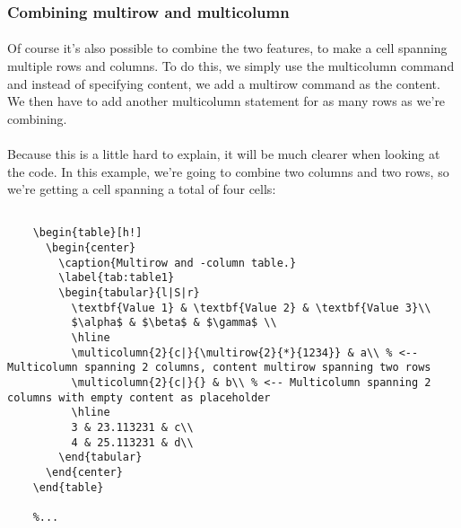   \subsubsection{Combining multirow and multicolumn}
  \paragraph{}
  Of course it's also possible to combine the two features, to make a cell spanning multiple rows and columns. To do this, we simply use the multicolumn command and instead of specifying content, we add a multirow command as the content. We then have to add another multicolumn statement for as many rows as we're combining.
  \paragraph{}
  Because this is a little hard to explain, it will be much clearer when looking at the code. In this example, we're going to combine two columns and two rows, so we're getting a cell spanning a total of four cells:
  \begin{lstlisting}[language={[LaTeX]TeX},breaklines=true,frame=single]
    %...

    \begin{table}[h!]
      \begin{center}
        \caption{Multirow and -column table.}
        \label{tab:table1}
        \begin{tabular}{l|S|r}
          \textbf{Value 1} & \textbf{Value 2} & \textbf{Value 3}\\
          $\alpha$ & $\beta$ & $\gamma$ \\
          \hline
          \multicolumn{2}{c|}{\multirow{2}{*}{1234}} & a\\ % <-- Multicolumn spanning 2 columns, content multirow spanning two rows
          \multicolumn{2}{c|}{} & b\\ % <-- Multicolumn spanning 2 columns with empty content as placeholder
          \hline
          3 & 23.113231 & c\\
          4 & 25.113231 & d\\
        \end{tabular}
      \end{center}
    \end{table}
    
    %...
  \end{lstlisting}
